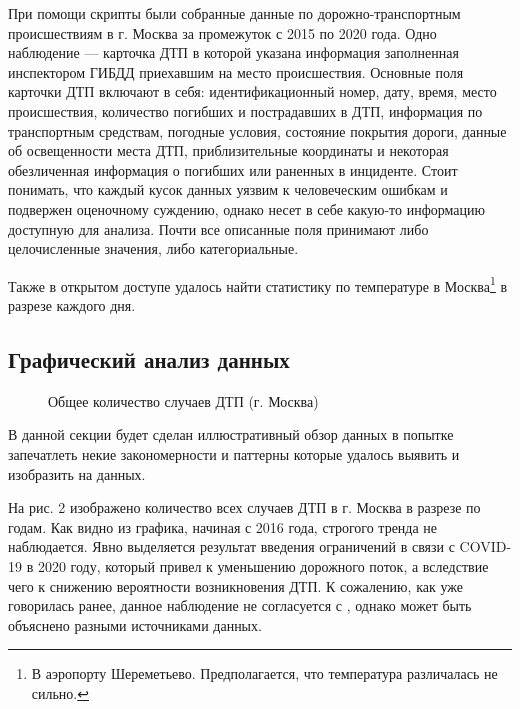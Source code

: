 \documentclass[a4paper, 14pt]{article}
\begin{document}
При помощи скрипты были собранные данные по дорожно-транспортным происшествиям в г. Москва за промежуток с 2015 по 2020 года. Одно наблюдение --- карточка ДТП в которой указана информация заполненная инспектором ГИБДД приехавшим на место происшествия. Основные поля карточки ДТП включают в себя: идентификационный номер, дату, время, место происшествия, количество погибших и пострадавших в ДТП, информация по транспортным средствам, погодные условия, состояние покрытия дороги, данные об освещенности места ДТП, приблизительные координаты и некоторая обезличенная информация о погибших или раненных в инциденте. Стоит понимать, что каждый кусок данных уязвим к человеческим ошибкам и подвержен оценочному суждению, однако несет в себе какую-то информацию доступную для анализа. Почти все описанные поля принимают либо целочисленные значения, либо категориальные.

Также в открытом доступе удалось найти статистику по температуре в Москва\footnote{В аэропорту Шереметьево. Предполагается, что температура различалась не сильно.} в разрезе каждого дня. 

\subsection{Графический анализ данных}

\begin{figure}[h]
	\caption{Общее количество случаев ДТП (г. Москва)}
\end{figure}

В данной секции будет сделан иллюстративный обзор данных в попытке запечатлеть некие закономерности и паттерны которые удалось выявить и изобразить на данных. 

На рис. 2 изображено количество всех случаев ДТП в г. Москва в разрезе по годам. Как видно из графика, начиная с 2016 года, строгого тренда не наблюдается. Явно выделяется результат введения ограничений в связи с COVID-19 в 2020 году, который привел к уменьшению дорожного поток, а вследствие чего к снижению вероятности возникновения ДТП. К сожалению, как уже говорилась ранее, данное наблюдение не согласуется с \cite{rbkNews}, однако может быть объяснено разными источниками данных. 
\end{document}
